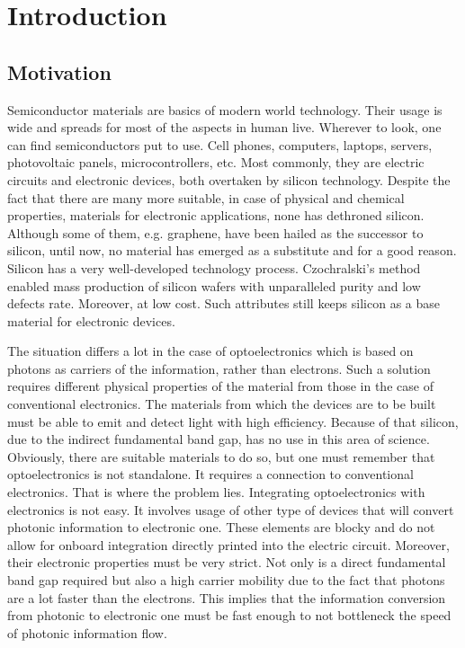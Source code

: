 \chapter{Introduction}
\label{chap:intro}

\section{Motivation}

Semiconductor materials are basics of modern world technology. Their usage is wide and spreads for most of the aspects in human live. Wherever to look, one can find semiconductors put to use. Cell phones, computers, laptops, servers, photovoltaic panels, microcontrollers, etc. Most commonly, they are electric circuits and electronic devices, both overtaken by silicon technology. Despite the fact that there are many more suitable, in case of physical and chemical properties, materials for electronic applications, none has dethroned silicon. Although some of them, e.g. graphene, have been hailed as the successor to silicon, until now, no material has emerged as a substitute and for a good reason. Silicon has a very well-developed technology process. Czochralski's method enabled mass production of silicon wafers with unparalleled purity and low defects rate. Moreover, at low cost. Such attributes still keeps silicon as a base material for electronic devices.

The situation differs a lot in the case of optoelectronics which is based on photons as carriers of the information, rather than electrons. Such a solution requires different physical properties of the material from those in the case of conventional electronics. The materials from which the devices are to be built must be able to emit and detect light with high efficiency. Because of that silicon, due to the indirect fundamental band gap, has no use in this area of science. Obviously, there are suitable materials to do so, but one must remember that optoelectronics is not standalone. It requires a connection to conventional electronics. That is where the problem lies. Integrating optoelectronics with electronics is not easy. It involves usage of other type of devices that will convert photonic information to electronic one. These elements are blocky and do not allow for onboard integration directly printed into the electric circuit. Moreover, their electronic properties must be very strict. Not only is a direct fundamental band gap required but also a high carrier mobility due to the fact that photons are a lot faster than the electrons. This implies that the information conversion from photonic to electronic one must be fast enough to not bottleneck the speed of photonic information flow.

